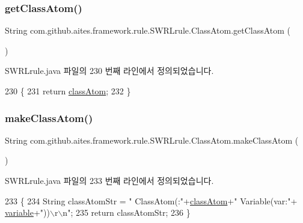 \subsubsection{\texorpdfstring{get\+Class\+Atom()}{getClassAtom()}}
{\footnotesize\ttfamily String com.\+github.\+aites.\+framework.\+rule.\+S\+W\+R\+Lrule.\+Class\+Atom.\+get\+Class\+Atom (\begin{DoxyParamCaption}{ }\end{DoxyParamCaption})}



S\+W\+R\+Lrule.\+java 파일의 230 번째 라인에서 정의되었습니다.


\begin{DoxyCode}
230                                     \{
231             \textcolor{keywordflow}{return} \mbox{\hyperlink{classcom_1_1github_1_1aites_1_1framework_1_1rule_1_1_s_w_r_lrule_1_1_class_atom_a6735d699f58d97538b7a95e13a9e9584}{classAtom}};
232         \}
\end{DoxyCode}
\mbox{\label{classcom_1_1github_1_1aites_1_1framework_1_1rule_1_1_s_w_r_lrule_1_1_class_atom_a2eb6b4aa3b5bc678c09da10eae2b9ee7}} 
\subsubsection{\texorpdfstring{make\+Class\+Atom()}{makeClassAtom()}}
{\footnotesize\ttfamily String com.\+github.\+aites.\+framework.\+rule.\+S\+W\+R\+Lrule.\+Class\+Atom.\+make\+Class\+Atom (\begin{DoxyParamCaption}{ }\end{DoxyParamCaption})}



S\+W\+R\+Lrule.\+java 파일의 233 번째 라인에서 정의되었습니다.


\begin{DoxyCode}
233                                      \{
234             String classAtomStr = \textcolor{stringliteral}{"            ClassAtom(:"}+\mbox{\hyperlink{classcom_1_1github_1_1aites_1_1framework_1_1rule_1_1_s_w_r_lrule_1_1_class_atom_a6735d699f58d97538b7a95e13a9e9584}{classAtom}}+\textcolor{stringliteral}{" Variable(var:"}+
      \mbox{\hyperlink{classcom_1_1github_1_1aites_1_1framework_1_1rule_1_1_s_w_r_lrule_1_1_class_atom_a62cc90c658adacfcc945bf96a0748c2c}{variable}}+\textcolor{stringliteral}{"))\(\backslash\)r\(\backslash\)n"};
235             \textcolor{keywordflow}{return} classAtomStr;
236         \}
\end{DoxyCode}


